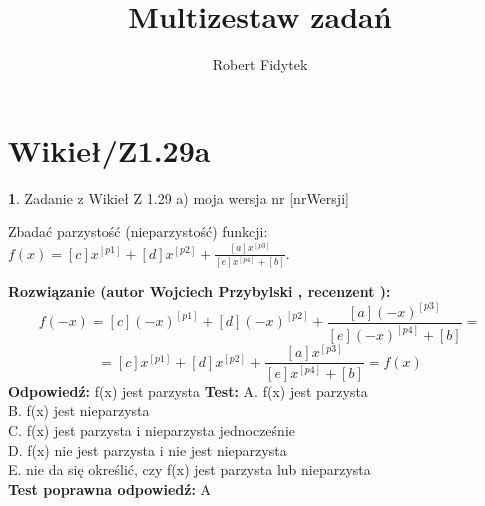 \documentclass[12pt, a4paper]{article}
\title{Multizestaw zadań}
\author{Robert Fidytek}
\date{}
\theoremstyle{definition} %
\newtheorem{zad}{}
\newcommand{\kategoria}[1]{\section{#1}} %
\newcommand{\zadStart}[1]{\begin{zad}#1\newline} %
\newcommand{\zadStop}{\end{zad}}   %
\newcommand{\rozwStart}[2]{\noindent \textbf{Rozwiązanie (autor #1 , recenzent #2): }\newline} %
\newcommand{\rozwStop}{\newline}                                            %
\newcommand{\odpStart}{\noindent \textbf{Odpowiedź:}\newline}    %
\newcommand{\odpStop}{\newline}                                             %
\newcommand{\testStart}{\noindent \textbf{Test:}\newline} %
\newcommand{\testStop}{\newline} %
\newcommand{\kluczStart}{\noindent \textbf{Test poprawna odpowiedź:}\newline} %
\newcommand{\kluczStop}{\newline} %
\begin{document}
\maketitle


\kategoria{Wikieł/Z1.29a}
\zadStart{Zadanie z Wikieł Z 1.29 a) moja wersja nr [nrWersji]}

Zbadać parzystość (nieparzystość) funkcji:\\ $ f(x)=[c]x^{[p1]}+[d]x^{[p2]}+\frac{[a]x^{[p3]}}{[e]x^{[p4]}+[b]} $.
\zadStop
\rozwStart{Wojciech Przybylski}{}
$$f(-x)=[c](-x)^{[p1]}+[d](-x)^{[p2]}+\frac{[a](-x)^{[p3]}}{[e](-x)^{[p4]}+[b]}=$$
$$=[c]x^{[p1]}+[d]x^{[p2]}+\frac{[a]x^{[p3]}}{[e]x^{[p4]}+[b]}=f(x) $$
\rozwStop
\odpStart
f(x) jest parzysta
\odpStop
\testStart
A. f(x) jest parzysta\\
B. f(x) jest nieparzysta\\
C. f(x) jest parzysta i nieparzysta jednocześnie\\
D. f(x) nie jest parzysta i nie jest nieparzysta\\
E. nie da się określić, czy f(x) jest parzysta lub nieparzysta\\
\testStop
\kluczStart
A
\kluczStop
\end{document}
